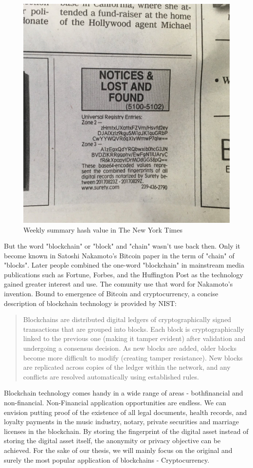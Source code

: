 \begin{figure}[h!]
	\centering
	\includegraphics[width=.35\textwidth]{images/Widely_Witnessed_Values.jpg}
	\caption[Widely-Witnessed Values of Surety, a weekly summary (hash) of documents]{Weekly summary hash value in The New York Times}
	\label{fig:first_blockchain}
\end{figure}

But the word "blockchain" or "block" and "chain" wasn't use back then. 
Only it become known in Satoshi Nakamoto's Bitcoin paper in the term of "chain" of "blocks".
Later people combined the one-word "blockchain" in mainstream media publications such as Fortune, Forbes, and the Huffington Post as the technology gained greater interest and use. 
The comunity use that word for Nakamoto's invention.
Bound to emergence of Bitcoin and cryptocurrency, a concise description of blockchain technology is provided by NIST:

\begin{quote} 
	Blockchains are distributed digital ledgers of cryptographically signed transactions that are grouped into blocks. Each block is cryptographically linked to the previous one (making it tamper evident) after validation and undergoing a consensus decision. As new blocks are added, older blocks become more difficult to modify (creating tamper resistance). New blocks are replicated across copies of the ledger within the network, and any conflicts are resolved automatically using established rules.
\end{quote}

Blockchain technology comes handy in a wide range of areas - both ​financial and non-financial​. 
Non-Financial application opportunities are endless. 
We can envision putting proof of the existence of all legal documents, health records, and loyalty payments in the music industry, notary, private securities and marriage licenses in the blockchain. 
By storing the fingerprint of the digital asset instead of storing the digital asset itself, the anonymity or privacy objective can be achieved.
For the sake of our thesis, we will mainly focus on the original and surely the most popular application of blockchains - Cryptocurrency.

